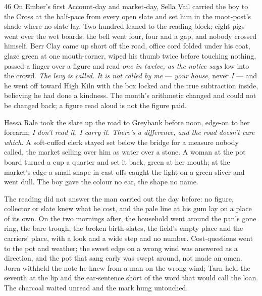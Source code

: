 
\scenebreak


\scenebreak


\scenebreak

\CRtailpiece
\begin{CRchronicle}{46}
On Ember’s first Account-day and market-day, Sella Vail carried the boy to the Cross at the half-pace from every open slate and set him in the moot-post’s shade where no slate lay. Two hundred leaned to the reading block; eight pigs went over the wet boards; the bell went four, four and a gap, and nobody crossed himself. Berr Clay came up short off the road, office cord folded under his coat, glaze green at one mouth-corner, wiped his thumb twice before touching nothing, passed a finger over a figure and read \emph{one in twelve, as the notice says} low into the crowd. \emph{The levy is called. It is not called by me} --- \emph{your house}, never \emph{I} --- and he went off toward High Kiln with the box locked and the true subtraction inside, believing he had done a kindness. The month’s arithmetic changed and could not be changed back; a figure read aloud is not the figure paid.

Hessa Rale took the slate up the road to Greybank before noon, edge-on to her forearm: \emph{I don’t read it. I carry it. There’s a difference, and the road doesn’t care which.} A soft-cuffed clerk stayed set below the bridge for a measure nobody called, the market selling over him as water over a stone. A woman at the pot board turned a cup a quarter and set it back, green at her mouth; at the market’s edge a small shape in cast-offs caught the light on a green sliver and went dull. The boy gave the colour no ear, the shape no name.

The reading did not answer the man carried out the day before: no figure, collector or slate knew what he cost, and the pale line at his gum lay on a place of its own. On the two mornings after, the household went around the pan’s gone ring, the bare trough, the broken birth-slates, the field’s empty place and the carriers’ place, with a look and a wide step and no number. Cost-questions went to the pot and weather; the sweet edge on a wrong wind was answered as a direction, and the pot that sang early was swept around, not made an omen. Jorra withheld the note he knew from a man on the wrong wind; Tarn held the seventh at the lip and the ear-sentence short of the word that would call the loan. The charcoal waited unread and the mark hung untouched.


\end{CRchronicle}
